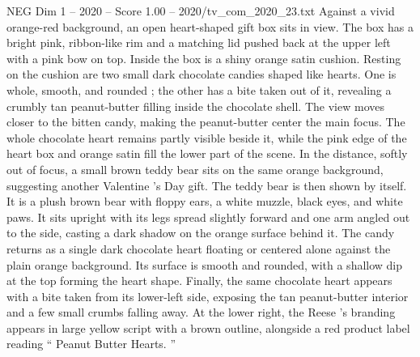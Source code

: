 \begin{textsample}{NEG Dim 1 – 2020 – Score 1.00 – 2020/tv\_com\_2020\_23.txt}  \label{ex:f1_neg_082}
Against a vivid orange-red background, an open heart-shaped gift box sits in view.
The box has a bright pink, ribbon-like rim and a matching lid pushed back at the upper left with a pink bow on top.
Inside the box is a shiny orange satin cushion.
Resting on the cushion are two small dark chocolate candies shaped like hearts.
One is whole, smooth, and rounded ; the other has a bite taken out of it, revealing a crumbly tan peanut-butter filling inside the chocolate shell.
The view moves closer to the bitten candy, making the peanut-butter center the main focus.
The whole chocolate heart remains partly visible beside it, while the pink edge of the heart box and orange satin fill the lower part of the scene.
In the distance, softly out of focus, a small brown teddy bear sits on the same orange background, suggesting another Valentine ’s Day gift.
The teddy bear is then shown by itself.
It is a plush brown bear with floppy ears, a white muzzle, black eyes, and white paws.
It sits upright with its legs spread slightly forward and one arm angled out to the side, casting a dark shadow on the orange surface behind it.
The candy returns as a single dark chocolate heart floating or centered alone against the plain orange background.
Its surface is smooth and rounded, with a shallow dip at the top forming the heart shape.
Finally, the same chocolate heart appears with a bite taken from its lower-left side, exposing the tan peanut-butter interior and a few small crumbs falling away.
At the lower right, the Reese ’s branding appears in large yellow script with a brown outline, alongside a red product label reading “ Peanut Butter Hearts. ”

\end{textsample}
